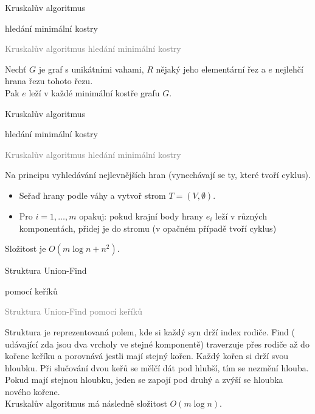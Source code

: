 \documentclass[20pt]{extarticle}
\newcommand{\card}[3][]{
	\vspace*{\fill}

	\newpage
	\topskip0pt
	\vspace*{\fill}
		\Large #2

		\vspace{1cm}
		\normalsize #1
	\vspace*{\fill}
	\newpage

	\small \textcolor{gray}{#2 #1}
	\topskip0pt
	\vspace*{\fill}

	\normalsize
	#3
	\vspace*{\fill}
}
\begin{document}
\begin{center}
\card[hledání minimální kostry]{Kruskalův algoritmus}{
	Nechť $G$ je graf s unikátními vahami, $R$ nějaký jeho elementární řez a $e$ nejlehčí
	hrana řezu tohoto řezu.\\
	Pak $e$ leží v každé minimální kostře grafu $G$.
}

\card[hledání minimální kostry]{Kruskalův algoritmus}{
	\small
	Na principu vyhledávání nejlevnějších hran (vynechávají se ty, které tvoří cyklus).
	\begin{itemize}
		\item Seřaď hrany podle váhy a vytvoř strom $T=(V, \emptyset)$.
		\item Pro $i=1,\dots,m$ opakuj: pokud krajní body hrany $e_i$ leží v různých
		komponentách, přidej je do stromu (v opačném případě tvoří cyklus)
	\end{itemize}
	Složitost je $O(m \log n + n^2)$.
}

\card[pomocí keříků]{Struktura Union-Find}{
	\small
	Struktura je reprezentovaná polem, kde si každý syn drží index rodiče. Find (
	udávající zda jsou dva vrcholy ve stejné komponentě) traverzuje přes rodiče
	až do kořene keříku a porovnává jestli mají stejný kořen. Každý kořen si drží
	svou hloubku. Při slučování dvou keřů se mělčí dát pod hlubší, tím se nezmění hlouba.
	Pokud mají stejnou hloubku, jeden se zapojí pod druhý a zvýší se hloubka nového kořene.\\
	Kruskalův algoritmus má následně složitost $O(m \log n)$.
}

\end{center}
\end{document}
